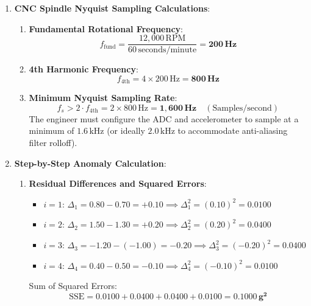 \begin{enumerate}
    \item \textbf{CNC Spindle Nyquist Sampling Calculations}:
    \begin{enumerate}
        \item \textbf{Fundamental Rotational Frequency}:
        \begin{equation*}
        f_{\text{fund}} = \frac{12{,}000\,\text{RPM}}{60\,\text{seconds/minute}} = \mathbf{200\,\text{Hz}}
        \end{equation*}
        \item \textbf{4th Harmonic Frequency}:
        \begin{equation*}
        f_{\text{4th}} = 4 \times 200\,\text{Hz} = \mathbf{800\,\text{Hz}}
        \end{equation*}
        \item \textbf{Minimum Nyquist Sampling Rate}:
        \begin{equation*}
        f_{s} > 2 \cdot f_{\text{4th}} = 2 \times 800\,\text{Hz} = \mathbf{1{,}600\,\text{Hz}} \quad (\text{Samples/second})
        \end{equation*}
        The engineer must configure the ADC and accelerometer to sample at a minimum of $1.6\,\text{kHz}$ (or ideally $2.0\,\text{kHz}$ to accommodate anti-aliasing filter rolloff).
    \end{enumerate}

    \item \textbf{Step-by-Step Anomaly Calculation}:
    \begin{enumerate}
        \item \textbf{Residual Differences and Squared Errors}:
        \begin{itemize}
            \item $i=1$: $\Delta_1 = 0.80 - 0.70 = +0.10 \implies \Delta_1^2 = (0.10)^2 = \mathbf{0.0100}$
            \item $i=2$: $\Delta_2 = 1.50 - 1.30 = +0.20 \implies \Delta_2^2 = (0.20)^2 = \mathbf{0.0400}$
            \item $i=3$: $\Delta_3 = -1.20 - (-1.00) = -0.20 \implies \Delta_3^2 = (-0.20)^2 = \mathbf{0.0400}$
            \item $i=4$: $\Delta_4 = 0.40 - 0.50 = -0.10 \implies \Delta_4^2 = (-0.10)^2 = \mathbf{0.0100}$
        \end{itemize}
        Sum of Squared Errors:
        \begin{equation*}
        \text{SSE} = 0.0100 + 0.0400 + 0.0400 + 0.0100 = \mathbf{0.1000\,\text{g}^2}
        \end{equation*}


\end{enumerate}
\end{enumerate}
